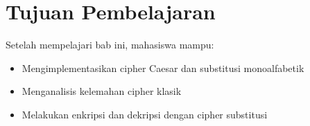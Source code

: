 \section*{Tujuan Pembelajaran}
Setelah mempelajari bab ini, mahasiswa mampu:
\begin{itemize}
\item Mengimplementasikan cipher Caesar dan substitusi monoalfabetik
\item Menganalisis kelemahan cipher klasik
\item Melakukan enkripsi dan dekripsi dengan cipher substitusi
\end{itemize}
